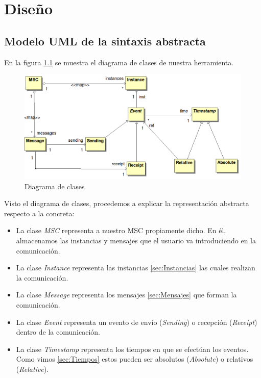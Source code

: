 \chapter{Diseño}
\label{ch:diseno}

\section{Modelo UML de la sintaxis abstracta}

En la figura \ref{fig:modelo-ast} se muestra el diagrama de clases de
nuestra herramienta.

\begin{figure}
  \includegraphics[width=1.0\linewidth]{./images/modelo-ast}
  \caption{Diagrama de clases}
  \label{fig:modelo-ast}
\end{figure}


Visto el diagrama de clases, procedemos a explicar la representación
abstracta respecto a la concreta:
\begin{itemize}
\item La clase \textit{MSC} representa a nuestro MSC propiamente
  dicho. En él, almacenamos las instancias y mensajes que el usuario va
  introduciendo en la comunicación.
\item La clase \textit{Instance} representa las instancias
  \ref{sec:Instancias}  las cuales realizan la comunicación.
\item La clase \textit{Message} representa los mensajes
  \ref{sec:Mensajes} que forman la comunicación.
\item La clase \textit{Event} representa un evento de envío
  (\textit{Sending}) o recepción (\textit{Receipt}) dentro de la
  comunicación.
\item La clase \textit{Timestamp} representa los tiempos en que se
  efectúan los eventos. Como vimos \ref{sec:Tiempos} estos pueden ser
  absolutos (\textit{Absolute}) o relativos (\textit{Relative}).
\end{itemize}

